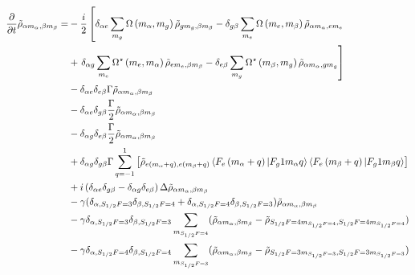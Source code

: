 \documentclass[11pt,a4paper]{article}
\begin{document}
\begin{align}
\frac{\partial}{\partial t} \tilde{\rho}_{\alpha m_{\alpha},\beta m_{\beta}} = &
- \frac{i}{2} \left[ \delta_{\alpha e}\sum_{m_g} \Omega \left( m_{\alpha},m_g \right) \tilde{\rho}_{g m_g, \beta m_{\beta}} - \delta_{g \beta}\sum_{m_e} \Omega \left( m_{e},m_\beta \right) \tilde{\rho}_{\alpha m_\alpha, e m_{e}} \right.\nonumber\\ &+ \left. \delta_{\alpha g}\sum_{m_e} \Omega^{\star} \left( m_{e},m_\alpha \right) \tilde{\rho}_{e m_e, \beta m_{\beta}} - \delta_{e \beta}\sum_{m_g} \Omega^{\star} \left( m_{\beta},m_g \right) \tilde{\rho}_{\alpha m_\alpha, g m_{g}} \right] \label{eq:masterpumpfield}   \\
&-\delta_{\alpha e}\delta_{e \beta} \Gamma \tilde{\rho}_{\alpha m_{\alpha}, \beta m_{\beta}} \label{eq:masterdissipation1}\\
&- \delta_{\alpha e}\delta_{g \beta} \frac{\Gamma}{2} \tilde{\rho}_{\alpha m_{\alpha},\beta m_{\beta}}\label{eq:masterdissipation2}\\
&- \delta_{\alpha g}\delta_{e \beta} \frac{\Gamma}{2} \tilde{\rho}_{\alpha m_{\alpha}, \beta m_{\beta}} \label{eq:masterdissipation3}\\
&+ \delta_{\alpha g}\delta_{g \beta} \Gamma \sum_{q = -1}^{1} \left[ \tilde{\rho}_{e \left( m_{\alpha} + q \right), e \left(m_{\beta}+q  \right)} \braket{F_e \left( m_{\alpha}+q \right) | F_g 1 m_{\alpha} q} \braket{  F_e \left( m_{\beta} + q \right)  | F_g 1 m_{\beta} q }\right]\label{eq:masterdissipation4}\\
&+ i \left( \delta_{\alpha e} \delta_{g \beta} - \delta_{\alpha g}\delta_{e \beta} \right) \Delta\tilde{\rho}_{\alpha m_{\alpha}, \beta m_{\beta}} \label{eq:masterfreeevolution}\\
&- \gamma (\delta_{\alpha,S_{1/2}F=3}\delta_{\beta,S_{1/2}F=4}+\delta_{\alpha,S_{1/2}F=4}\delta_{\beta,S_{1/2}F=3}) \tilde{\rho}_{\alpha m_{\alpha}, \beta m_{\beta}}\label{eq:groundstaterelax}\\
&- \gamma \delta_{\alpha,S_{1/2}F=3}\delta_{\beta,S_{1/2}F=3} \sum_{m_{S_{1/2}F=4}} (\tilde{\rho}_{\alpha m_{\alpha}, \beta m_{\beta}} - \tilde{\rho}_{S_{1/2}F=4 m_{S_{1/2}F=4},S_{1/2}F=4 m_{S_{1/2}F=4} })\label{eq:groundstaterelax2}\\
&- \gamma \delta_{\alpha,S_{1/2}F=4}\delta_{\beta,S_{1/2}F=4} \sum_{m_{S_{1/2}F=3}} (\tilde{\rho}_{\alpha m_{\alpha}, \beta m_{\beta}} - \tilde{\rho}_{S_{1/2}F=3 m_{S_{1/2}F=3},S_{1/2}F=3 m_{S_{1/2}F=3} })\label{eq:groundstaterelax3}
\end{align}
\end{document}
